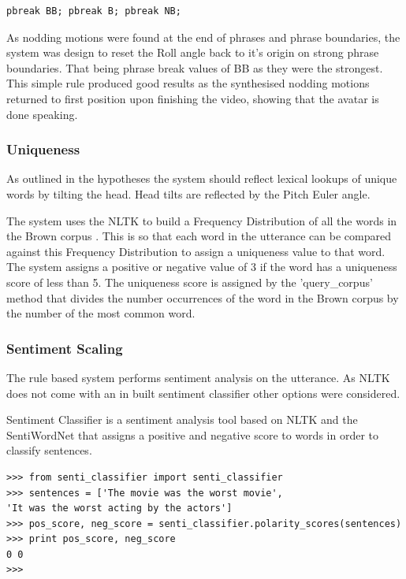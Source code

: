 \documentclass[bsc,frontabs,twoside,singlespacing,parskip,deptreport]{infthesis}
\begin{document}
\begin{lstlisting}
pbreak BB; pbreak B; pbreak NB;
\end{lstlisting}

As nodding motions were found at the end of phrases and phrase boundaries, the system was design to reset the Roll angle back to it's origin on strong phrase boundaries. That being phrase break values of BB as they were the strongest. This simple rule produced good results as the synthesised nodding motions returned to first position upon finishing the video, showing that the avatar is done speaking.

\subsubsection{Uniqueness}

As outlined in the hypotheses the system should reflect lexical lookups of unique words by tilting the head. Head tilts are reflected by the Pitch Euler angle.

The system uses the NLTK to build a Frequency Distribution of all the words in the Brown corpus \cite{brown}. This is so that each word in the utterance can be compared against this Frequency Distribution to assign a uniqueness value to that word. The system assigns a positive or negative value of 3 if the word has a uniqueness score of less than 5. The uniqueness score is assigned by the 'query\_corpus' method that divides the number occurrences of the word in the Brown corpus by the number of the most common word.

\subsubsection{Sentiment Scaling}

The rule based system performs sentiment analysis on the utterance. As NLTK does not come with an in built sentiment classifier other options were considered. 

Sentiment Classifier \cite{senti_class} is a sentiment analysis tool based on NLTK and the SentiWordNet that assigns a positive and negative score to words in order to classify sentences.


\begin{lstlisting}
>>> from senti_classifier import senti_classifier
>>> sentences = ['The movie was the worst movie', 
'It was the worst acting by the actors']
>>> pos_score, neg_score = senti_classifier.polarity_scores(sentences)
>>> print pos_score, neg_score
0 0
>>> 
\end{lstlisting}
\end{document}
